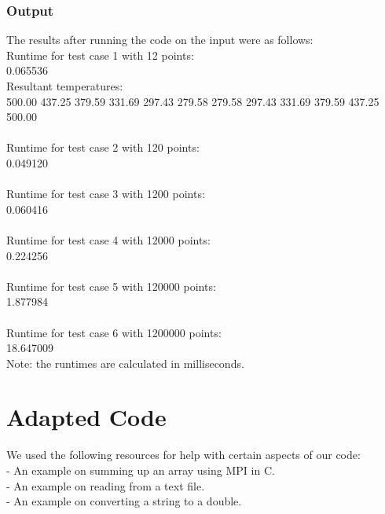 \documentclass{article}
\begin{document}
\subsubsection{Output}
	The results after running the code on the input were as follows:\\
	Runtime for test case 1 with 12 points:\\
	0.065536\\
	Resultant temperatures:\\
	500.00 437.25 379.59 331.69 297.43 279.58 279.58 297.43 331.69 379.59 437.25 500.00\\
	\\
	Runtime for test case 2 with 120 points:\\
	0.049120\\
	\\
	Runtime for test case 3 with 1200 points:\\
	0.060416\\
	\\
	Runtime for test case 4 with 12000 points:\\
	0.224256\\
	\\
	Runtime for test case 5 with 120000 points:\\
	1.877984\\
	\\
	Runtime for test case 6 with 1200000 points:\\
	18.647009\\
	Note: the runtimes are calculated in milliseconds.

\newpage
\section{Adapted Code}
We used the following resources for help with certain aspects of our code:\\
\citep{ArrayMPI} - An example on summing up an array using MPI in C.\\
\citep{ReadTxt} - An example on reading from a text file.\\
\citep{StringToDouble} - An example on converting a string to a double.\\

\newpage
{}
\end{document}
